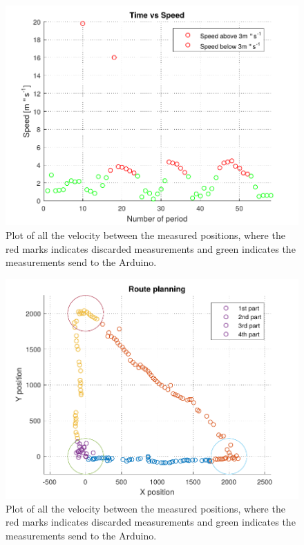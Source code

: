\begin{figure}[H]
  \centering
	\includegraphics[scale=0.8]{figures/AccTest3.pdf}
	\caption{Plot of all the velocity between the measured positions, where the red marks indicates discarded measurements and green indicates the measurements send to the Arduino.}
	\label{AccT3fig}
\end{figure}


\begin{figure}[H]
  \centering
	\includegraphics[scale=0.8]{figures/AccTest6.pdf}
	\caption{Plot of all the velocity between the measured positions, where the red marks indicates discarded measurements and green indicates the measurements send to the Arduino.}
	\label{AccT6fig}
\end{figure}


